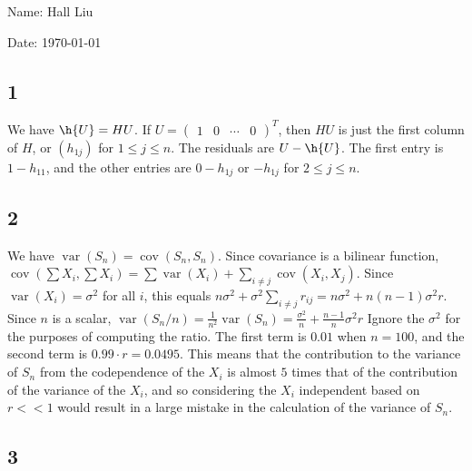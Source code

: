 \documentclass{article}
\newcommand{\openm}{\begin{pmatrix}}
\newcommand{\closem}{\end{pmatrix}}
\DeclareMathOperator{\cov}{cov}
\DeclareMathOperator{\var}{var}
\begin{document}
Name: Hall Liu

Date: \today 
\vspace{1.5cm}

\subsection*{1}
We have $\h{U}=HU$. If $U=\openm1&0&\cdots&0\closem^T$, then $HU$ is just the first column of $H$, or $(h_{1j})$ for $1\leq j\leq n$.
The residuals are $U-\h{U}$. The first entry is $1-h_{11}$, and the other entries are $0-h_{1j}$ or $-h_{1j}$ for $2\leq j\leq n$.
\subsection*{2}
We have $\var(S_n)=\cov(S_n,S_n)$. Since covariance is a bilinear function, $\cov(\sum X_i, \sum X_i)=\sum\var(X_i)+\sum_{i\neq j}\cov(X_i,X_j)$. Since $\var(X_i)=\sigma^2$ for all $i$, this equals $n\sigma^2+\sigma^2\sum_{i\neq j}r_{ij}=n\sigma^2+n(n-1)\sigma^2r$.
Since $n$ is a scalar, $\var(S_n/n)=\frac{1}{n^2}\var(S_n)=\frac{\sigma^2}{n}+\frac{n-1}{n}\sigma^2r$
Ignore the $\sigma^2$ for the purposes of computing the ratio. The first term is $0.01$ when $n=100$, and the second term is $0.99\cdot r=0.0495$. This means that the contribution to the variance of $S_n$ from the codependence of the $X_i$ is almost $5$ times that of the contribution of the variance of the $X_i$, and so considering the $X_i$ independent based on $r<<1$ would result in a large mistake in the calculation of the variance of $S_n$.
\subsection*{3}
\end{document}
